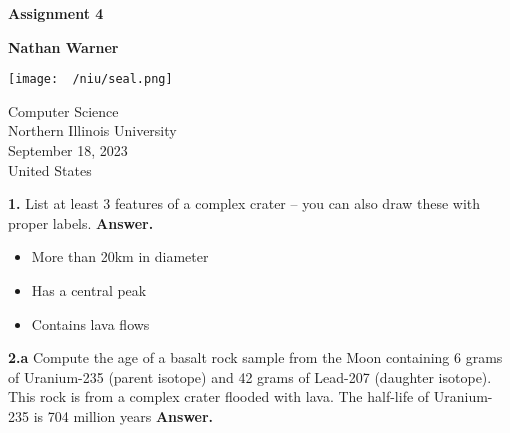 \documentclass{report}
\title{\Huge{}}
\author{\huge{Nathan Warner}}
\date{\huge{}}
\begin{document}
        \begin{titlepage}
       \begin{center}
           \vspace*{1cm}
    
           \textbf{Assignment 4}
    
           \vspace{0.5cm}
            
                
           \vspace{1.5cm}
    
           \textbf{Nathan Warner}
    
           \vfill
                
                
           \vspace{0.8cm}
         
           \texttt{[image: ~/niu/seal.png]}
                
           Computer Science \\
           Northern Illinois University\\
           September 18, 2023 \\
           United States\\
           
                
       \end{center}
    \end{titlepage}
    \tableofcontents
    \pagebreak \bigbreak \noindent
    \textbf{1.} List at least 3 features of a complex crater – you can also draw these with proper labels.
    \bigbreak \noindent 
    \textbf{Answer.} 
    \begin{itemize}
        \item More than 20km in diameter
        \item Has a central peak
        \item Contains lava flows
    \end{itemize}

    \bigbreak \noindent 
    \textbf{2.a} Compute the age of a basalt rock sample from the Moon containing 6 grams of Uranium-235 (parent isotope) and 42 grams of Lead-207 (daughter isotope). This rock is from a complex crater flooded with lava. The half-life of Uranium-235 is 704 million years
    \bigbreak \noindent 
    \textbf{Answer.} 
    \bigbreak \noindent 
    
\end{document}
